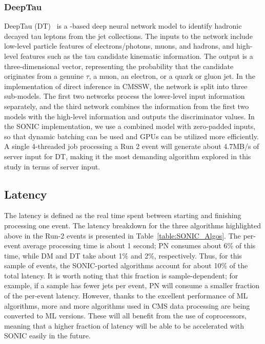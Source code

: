 \subsubsection{DeepTau}
DeepTau (DT)~\cite{CMS:2022prd} is a \TENSORFLOW-based deep neural network model to identify hadronic decayed tau leptons from the jet collections. The inputs to the network include low-level particle features of electrons/photons, muons, and hadrons, and high-level features such as the tau candidate kinematic information. The output is a three-dimensional vector, representing the probability that the candidate originates from a genuine $\tau$, a muon, an
electron, or a quark or gluon jet. In the implementation of direct inference in CMSSW, the network is split into three sub-models. The first two networks process the lower-level input information separately, and the third network combines the information from the first two models with the high-level information and outputs the discriminator values. In the SONIC implementation, we use a combined model with zero-padded inputs, so that dynamic batching can be used and GPUs can be utilized more efficiently. A single 4-threaded job processing a Run 2 \ttbar event will generate about 4.7\unit{MB/s} of server input for DT, making it the most demanding algorithm explored in this study in terms of server input.
    

\subsection{Latency}
The latency is defined as the real time spent between starting and finishing processing one event. The latency breakdown for the three algorithms highlighted above in the Run-2 \ttbar events is presented in Table~\ref{table:SONIC_Algos}. The per-event average processing time is about 1 second; PN consumes about 6\% of this time, while DM and DT take about 1\% and 2\%, respectively. Thus, for this sample of events, the SONIC-ported algorithms account for about 10\% of the total latency. It is worth noting that this fraction is sample-dependent; for example, if a sample has fewer jets per event, PN will consume a smaller fraction of the per-event latency. However, thanks to the excellent performance of ML algorithms, more and more algorithms used in CMS data processing are being converted to ML versions. These will all benefit from the use of coprocessors, meaning that a higher fraction of latency will be able to be accelerated with SONIC easily in the future.

